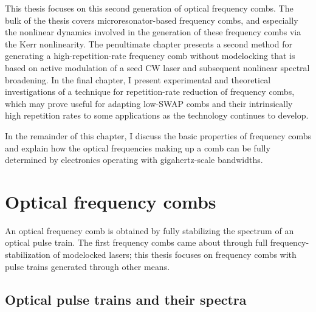 This thesis focuses on this second generation of optical frequency combs. The bulk of the thesis covers microresonator-based frequency combs, and especially the nonlinear dynamics involved in the generation of these frequency combs via the Kerr nonlinearity. The penultimate chapter presents a second method for generating a high-repetition-rate frequency comb without modelocking that is based on active modulation of a seed CW laser and subsequent nonlinear spectral broadening. In the final chapter, I present experimental and theoretical investigations of a technique for repetition-rate reduction of frequency combs, which may prove useful for adapting low-SWAP combs and their intrinsically high repetition rates to some applications as the technology continues to develop.

In the remainder of this chapter, I discuss the basic properties of frequency combs and explain how the optical frequencies making up a comb can be fully determined by electronics operating with gigahertz-scale bandwidths.

\section{Optical frequency combs}

An optical frequency comb is obtained by fully stabilizing the spectrum of an optical pulse train. The first frequency combs came about through full frequency-stabilization of modelocked lasers; this thesis focuses on frequency combs with pulse trains generated through other means.

\subsection{Optical pulse trains and their spectra}


